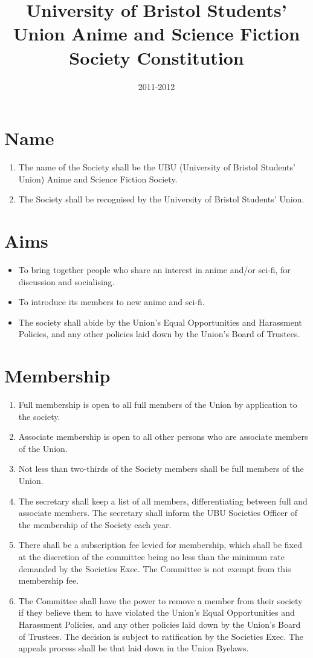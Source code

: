 \documentclass[a4paper,10pt]{article}
\title{University of Bristol Students’ Union Anime and Science Fiction Society Constitution}
\date{2011-2012}
\begin{document}
\maketitle
\amendmentintro
\section{Name}
\begin{enumerate}
  \item The name of the Society shall be the UBU (University of Bristol Students’ Union) Anime and Science Fiction Society.
  \item The Society shall be recognised by the University of Bristol Students’ Union.
\end{enumerate}

\section{Aims}
\begin{itemize}
  \item To bring together people who share an interest in anime and/or sci-fi, for discussion and socialising.
  \item To introduce its members to new anime and sci-fi.
  \item The society shall abide by the Union’s Equal Opportunities and Harassment Policies, and any other policies laid down by the Union’s Board of Trustees.
\end{itemize}


\section{Membership}
\begin{enumerate}
  \item Full membership is open to all full members of the Union by application to the society.
  \item Associate membership is open to all other persons who are associate members of the Union.
  \item Not less than two-thirds of the Society members shall be full members of the Union.
  \item The secretary shall keep a list of all members, differentiating between full and associate members. The secretary shall inform the UBU Societies Officer of the membership of the Society each year.
  \item There shall be a subscription fee levied for membership, which shall be fixed at the discretion of the committee being no less than the minimum rate demanded by the Societies Exec. The Committee is not exempt from this membership fee.
  \item The Committee shall have the power to remove a member from their society if they believe them to have violated the Union’s Equal Opportunities and Harassment Policies, and any other policies laid down by the Union’s Board of Trustees. The decision is subject to ratification by the Societies Exec. The appeals process shall be that laid down in the Union Byelaws.
\end{enumerate}
\end{document}
